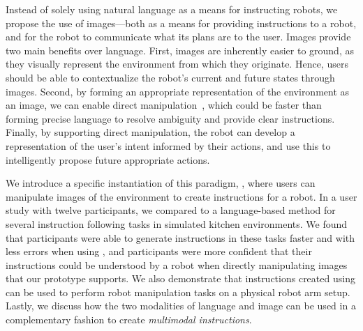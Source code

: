 Instead of solely using natural language as a means for instructing robots, we propose the use of images---both as a means for providing instructions to a robot, and for the robot to communicate what its plans are to the user. Images provide two main benefits over language. First, images are inherently easier to ground, as they visually represent the environment from which they originate. Hence, users should be able to contextualize the robot's current and future states through images. Second, by forming an appropriate representation of the environment as an image, we can enable direct manipulation~\cite{shneiderman1983direct}, which could be faster than forming precise language to resolve ambiguity and provide clear instructions. Finally, by supporting direct manipulation, the robot can develop a representation of the user's intent informed by their actions, and use this to intelligently propose future appropriate actions.

We introduce a specific instantiation of this paradigm, \projname, where users can manipulate images of the environment to create instructions for a robot. In a user study with twelve participants, we compared \projname to a language-based method for several instruction following tasks in simulated kitchen environments. We found that participants were able to generate instructions in these tasks faster and with less errors when using \projname, and participants were more confident that their instructions could be understood by a robot when directly manipulating images that our prototype supports. We also demonstrate that instructions created using \projname can be used to perform robot manipulation tasks on a physical robot arm setup. Lastly, we discuss how the two modalities of language and image can be used in a complementary fashion to create \textit{multimodal instructions}.







